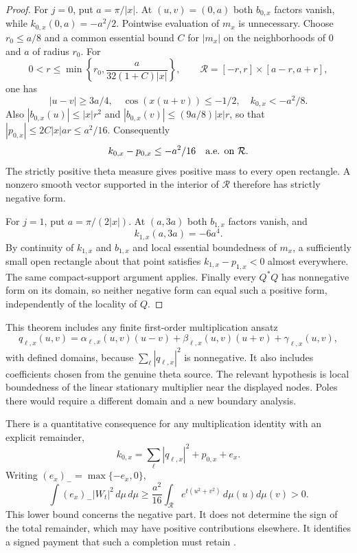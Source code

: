 \documentclass[11pt]{article}
\numberwithin{equation}{section}
\theoremstyle{definition}
\theoremstyle{remark}
\begin{document}
\begin{proof}
For $j=0$, put $a=\pi/|x|$.  At $(u,v)=(0,a)$ both $b_{0,x}$ factors
vanish, while $k_{0,x}(0,a)=-a^2/2$.  Pointwise evaluation of $m_x$
is unnecessary.  Choose $r_0\le a/8$ and a common essential bound $C$
for $|m_x|$ on the neighborhoods of $0$ and $a$ of radius $r_0$.
For
\[
 0<r\le\min\left\{r_0,\frac{a}{32(1+C)|x|}\right\},\qquad
 \mathcal R=[-r,r]\times[a-r,a+r],
\]
one has
\[
 |u-v|\ge3a/4,\quad \cos(x(u+v))\le-1/2,\quad
 k_{0,x}<-a^2/8.
\]
Also $|b_{0,x}(u)|\le |x|r^2$ and
$|b_{0,x}(v)|\le(9a/8)|x|r$, so that
$|p_{0,x}|\le2C|x|ar\le a^2/16$.  Consequently
\begin{equation}
 k_{0,x}-p_{0,x}\le-a^2/16\quad\hbox{a.e. on }\mathcal R.
 \label{eq:theta-negative-rectangle}
\end{equation}
The strictly positive theta measure gives positive mass to every open
rectangle.  A nonzero smooth vector supported in the interior of
$\mathcal R$ therefore has strictly negative form.

For $j=1$, put $a=\pi/(2|x|)$.  At $(a,3a)$ both $b_{1,x}$ factors
vanish, and
\[
 k_{1,x}(a,3a)=-6a^4.
\]
By continuity of $k_{1,x}$ and $b_{1,x}$ and local essential
boundedness of $m_x$, a sufficiently small open rectangle about that
point satisfies $k_{1,x}-p_{1,x}<0$ almost everywhere.  The same
compact-support argument applies.  Finally every $Q^*Q$ has
nonnegative form on its domain, so neither negative form can equal
such a positive form, independently of the locality of $Q$.
\end{proof}

This theorem includes any finite first-order multiplication ansatz
\[
 q_{\ell,x}(u,v)=\alpha_{\ell,x}(u,v)(u-v)
       +\beta_{\ell,x}(u,v)(u+v)+\gamma_{\ell,x}(u,v),
\]
with defined domains, because $\sum_\ell|q_{\ell,x}|^2$ is
nonnegative.  It also includes coefficients chosen from the genuine
theta source.  The relevant hypothesis is local boundedness of the
linear stationary multiplier near the displayed nodes.  Poles there
would require a different domain and a new boundary analysis.

There is a quantitative consequence for any multiplication identity
with an explicit remainder,
\[
 k_{0,x}=\sum_\ell|q_{\ell,x}|^2+p_{0,x}+e_x.
\]
Writing $(e_x)_-=\max\{-e_x,0\}$,
\begin{equation}
 \int (e_x)_-|W_t|^2\,d\mu\,d\mu
 \ge\frac{a^2}{16}\int_{\mathcal R}
          e^{t(u^2+v^2)}\,d\mu(u)d\mu(v)>0.
 \label{eq:theta-negative-payment}
\end{equation}
This lower bound concerns the negative part.  It does not determine the
sign of the total remainder, which may have positive contributions
elsewhere.  It identifies a signed payment that such a completion must
retain \cite{localobstruction}.
\end{document}
